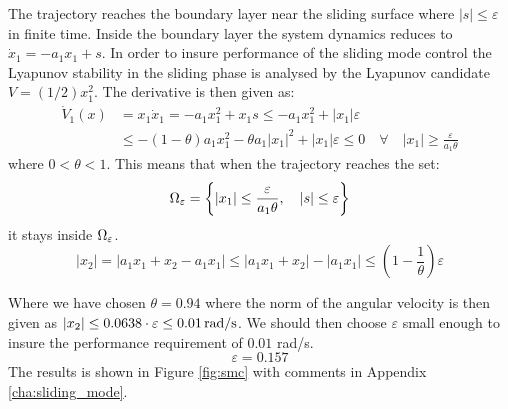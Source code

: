 The trajectory reaches the boundary layer near the sliding surface where $|s| \leq \varepsilon$ in finite time. Inside the boundary layer the system dynamics reduces to $\dot{x}_1 = -a_1 x_1 + s$. In order to insure performance of the sliding mode control the Lyapunov stability in the sliding phase is analysed by the Lyapunov candidate $V = (1/2) x_1^2$. The derivative is then given as:
\begin{equation}
        \begin{split}
                \dot{V}_1(x) &= x_1 \dot{x}_1 = -a_1 x_1^2 + x_1 s \leq -a_1 x_1^2 + |x_1| \varepsilon \\
                &\leq -(1-\theta)a_1 x_1^2 - \theta a_1|x_1|^2 + |x_1|\varepsilon \leq 0 \quad \forall \quad |x_1| \geq \frac{\varepsilon}{a_1 \theta}
        \end{split}
\end{equation}
where $0 < \theta < 1$. This means that when the trajectory reaches the set:
\begin{equation}
        \Omega_{\mathrm{\varepsilon}} = \left\{|x_1| \leq \frac{\varepsilon}{a_1 \theta}, \quad |s| \leq \varepsilon \right\}
\end{equation}
it stays inside $\Omega_{\mathrm{\varepsilon}}$. 
\begin{equation}
        |x_2| = |a_1 x_1 + x_2 - a_1 x_1| \leq |a_1 x_1 + x_2| - |a_1 x_1| \leq \left(1 - \frac{1}{\theta}\right)\varepsilon
\end{equation}

Where we have chosen $\theta = 0.94$ where the norm of the angular velocity is then given as $|x_2| \leq 0.0638 \cdot \varepsilon \leq 0.01 \, \text{rad/s}$. We should then choose $\varepsilon$ small enough to insure the performance requirement of $0.01$ rad/s.
\begin{equation}
         \varepsilon = 0.157 \nonumber
 \end{equation} 
 The results is shown in Figure \ref{fig:smc} with comments in Appendix \ref{cha:sliding_mode}.

